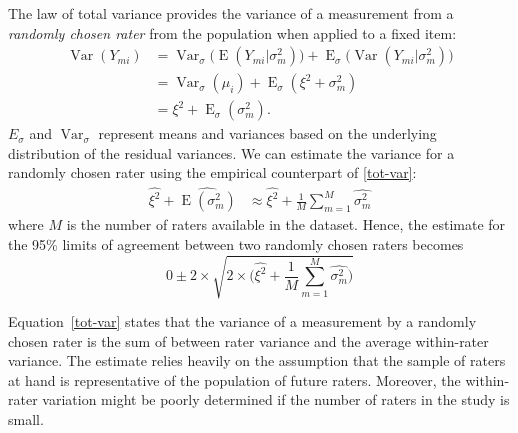 \documentclass[aoas]{imsart}
\newcommand{\V}{\operatorname{Var}}
\newcommand{\E}{\operatorname{E}}
\newcommand{\median}{\operatorname{median}}
\begin{document}
The law of total variance provides the variance of a measurement from
a \emph{randomly chosen rater} from the population when applied to a fixed
item:
\begin{equation}
\begin{split}
\V(Y_{mi}) &=  \V_\sigma\bigl(\E(Y_{mi}|\sigma_m^2)\bigr) +
              \E_\sigma\bigl(\V(Y_{mi}|\sigma_m^2)\bigr) \\
          &= \V_\sigma( \mu_i ) + \E_\sigma( \xi^2 + \sigma_m^2)\\
          &= \xi^2 + \E_\sigma(\sigma_m^2).
          \label{tot-var}
\end{split}
\end{equation}
$E_\sigma$ and $\V_\sigma$ represent means and variances based on the
underlying distribution of the residual variances.
We can estimate the variance for a randomly chosen rater using the empirical counterpart of \eqref{tot-var}:
\begin{equation}
  \begin{split}
   \widehat{\xi^2} + \widehat{\E(\sigma_m^2)}
   &\approx \widehat{\xi^2} + \frac 1M \sum_{m=1}^M \widehat{\sigma_m^2}
   \label{approximation}
  \end{split}
\end{equation}
where $M$ is the number of raters available in the dataset.  Hence,
the estimate for the 95\% limits of agreement between two randomly
chosen raters becomes
\begin{equation}
  0 \pm 2 \times \sqrt{2\times\bigl( \widehat{\xi^2} +
      \frac 1M \sum_{m=1}^M \widehat{\sigma_m^2}
      \bigr)}
\end{equation}

Equation~\ref{tot-var} states that the variance of a measurement by a
randomly chosen rater is the sum of between rater variance and the
average within-rater variance. The estimate relies heavily on the
assumption that the sample of raters at hand is representative of the
population of future raters. Moreover, the within-rater variation
might be poorly determined if the number of raters in the study is
small.
\end{document}
